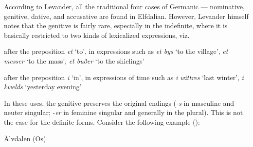 
According to Levander, all the traditional four cases of Germanic — nominative, genitive, dative, and accusative are found in Elfdalian. However, Levander himself notes that the genitive is fairly rare, especially in the indefinite, where it is basically restricted to two kinds of lexicalized expressions, viz. 


\item 

after the preposition \textit{et} ‘to’, in expressions such as \textit{et bys} ‘to the village’, \textit{et messer} ‘to the mass’, \textit{et buðer} ‘to the shielings’


\item 

after the preposition \textit{i} ‘in’, in expressions of time such as \textit{i wittres} ‘last winter’, \textit{i kwelds }‘yesterday evening’



In these uses, the genitive preserves the original endings (\textit{\nobreakdash-s }in masculine and neuter singular; \nobreakdash-\textit{er} in feminine singular and generally in the plural). This is not the case for the definite forms. Consider the following example (\citet[96]{Levander1909}):


\item 

Älvdalen (Os)


